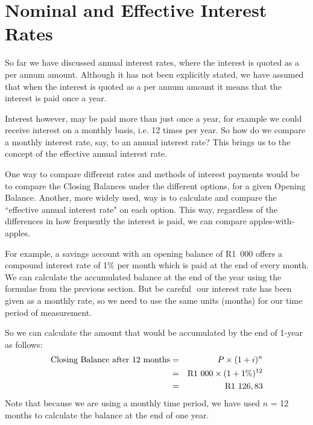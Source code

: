 \section{Nominal and Effective Interest Rates}
\label{m:f11:nominal}

So far we have discussed annual interest rates, where the interest is quoted as a per annum amount. Although it has not been explicitly stated, we have assumed that when the interest is quoted as a per annum amount it means that the interest is paid once a year.

Interest however, may be paid more than just once a year, for example we could receive interest on a monthly basis, i.e. 12 times per year. So how do we compare a monthly interest rate, say, to an annual interest rate? This brings us to the concept of the effective annual interest rate.

One way to compare different rates and methods of interest payments would be to compare the Closing Balances under the different options, for a given Opening Balance. Another, more widely used, way is to calculate and compare the ``effective annual interest rate" on each option. This way, regardless of the differences in how frequently the interest is paid, we can compare apples-with-apples.

For example, a savings account with an opening balance of R1~000 offers a compound interest rate of 1\% per month which is paid at the end of every month. We can calculate the accumulated balance at the end of the year using the formulae from the previous section. But be careful  our interest rate has been given as a monthly rate, so we need to use the same units (months) for our time period of measurement.


So we can calculate the amount that would be accumulated by the end of 1-year as follows:
\begin{eqnarray*}
\mbox{Closing Balance after 12 months}&=& P \times (1 + i)^n \\
&=& \rm{R}1~000 \times (1 + 1\%)^{12} \\
&=& \rm{R}1~126,83
\end{eqnarray*}
Note that because we are using a monthly time period, we have used $n$ = 12 months to calculate the balance at the end of one year.

